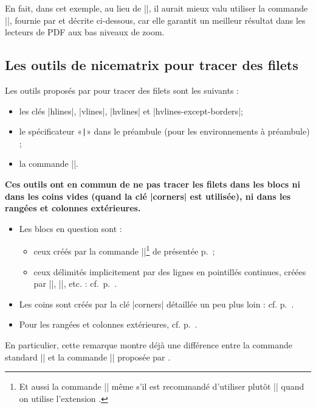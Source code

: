 \documentclass[dvipsnames]{article}%
\begin{document}
\medskip
En fait, dans cet exemple, au lieu de |\hline|, il aurait mieux valu utiliser la
commande |\Hline|, fournie par  et décrite ci-dessous, car elle
garantit un meilleur résultat dans les lecteurs de PDF aux bas niveaux de zoom.



\medskip
\subsection{Les outils de nicematrix pour tracer des filets}



Les outils proposés par  pour tracer des filets sont les
suivants :
\begin{itemize}
\item les clés |hlines|, |vlines|, |hvlines| et |hvlines-except-borders|;
\item le spécificateur «\verb+|+» dans le préambule (pour les environnements à
préambule) ;
\item {}
la commande |\Hline|.
\end{itemize}

\medskip
\textbf{Ces outils ont en commun de ne pas tracer les filets dans les blocs ni
  dans les coins vides (quand la clé |corners| est utilisée), ni dans les
  rangées et colonnes extérieures.}
\begin{itemize}
\item Les blocs en question sont :
\begin{itemize}
\item ceux créés par la commande |\Block|\footnote{Et aussi la commande |\multicolumn| même s'il
  est recommandé d'utiliser plutôt |\Block| quand on utilise l'extension
  .} de  présentée
p.~\pageref{Block};
\item ceux délimités implicitement par des lignes en pointillés continues, créées
par |\Cdots|, |\Vdots|, etc. : cf.~p.~\pageref{Cdots}.
\end{itemize}
\item Les coins sont créés par la clé |corners| détaillée un peu plus loin : cf.
p.~\pageref{corners}.
\item Pour les rangées et colonnes extérieures, cf. p.~\pageref{exterior}.
\end{itemize}

En particulier, cette remarque montre déjà une différence entre la commande
standard |\hline| et la commande |\Hline| proposée par .
\end{document}
